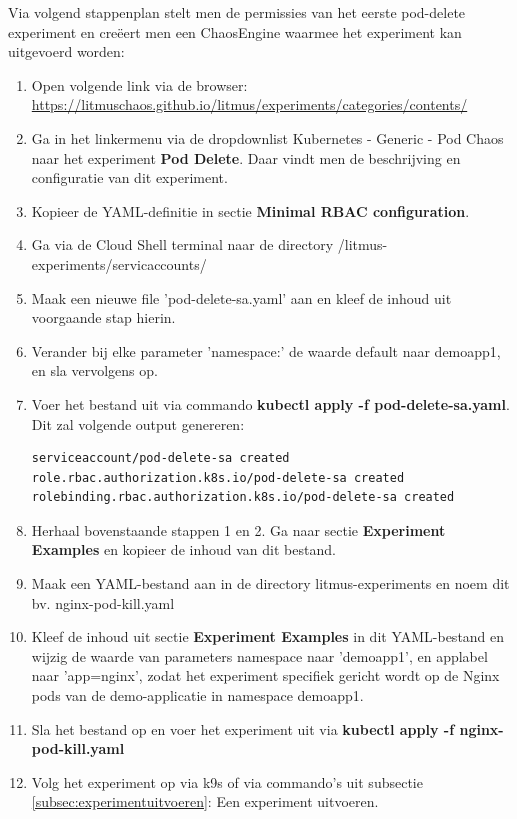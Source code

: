 Via volgend stappenplan stelt men de permissies van het eerste pod-delete experiment en creëert men een ChaosEngine waarmee het experiment kan uitgevoerd worden: 
\begin{enumerate}
    \item Open volgende link via de browser: \url{https://litmuschaos.github.io/litmus/experiments/categories/contents/} 
    \item Ga in het linkermenu via de dropdownlist Kubernetes - Generic - Pod Chaos naar het experiment {\bf Pod Delete}. Daar vindt men de beschrijving en configuratie van dit experiment.
    \item Kopieer de YAML-definitie in sectie {\bf Minimal RBAC configuration}.
    \item Ga via de Cloud Shell terminal naar de directory /litmus-experiments/servicaccounts/
    \item Maak een nieuwe file 'pod-delete-sa.yaml' aan en kleef de inhoud uit voorgaande stap hierin.
    \item Verander bij elke parameter 'namespace:' de waarde default naar demoapp1, en sla vervolgens op.
    \item Voer het bestand uit via commando {\bf kubectl apply -f pod-delete-sa.yaml}. Dit zal volgende output genereren:
\begin{lstlisting}[language=bash]    
serviceaccount/pod-delete-sa created
role.rbac.authorization.k8s.io/pod-delete-sa created
rolebinding.rbac.authorization.k8s.io/pod-delete-sa created
\end{lstlisting}
    \item Herhaal bovenstaande stappen 1 en 2. Ga naar sectie {\bf Experiment Examples} en kopieer de inhoud van dit bestand.
    \item Maak een YAML-bestand aan in de directory litmus-experiments en noem dit bv. nginx-pod-kill.yaml
    \item Kleef de inhoud uit sectie {\bf Experiment Examples} in dit YAML-bestand en wijzig  de waarde van parameters namespace naar 'demoapp1', en applabel naar 'app=nginx', zodat het experiment specifiek gericht wordt op de Nginx pods van de demo-applicatie in namespace demoapp1.
    \item Sla het bestand op en voer het experiment uit via {\bf kubectl apply -f nginx-pod-kill.yaml}
    \item Volg het experiment op via k9s of via commando's uit subsectie \ref{subsec:experimentuitvoeren}: Een experiment uitvoeren.
\end{enumerate}

